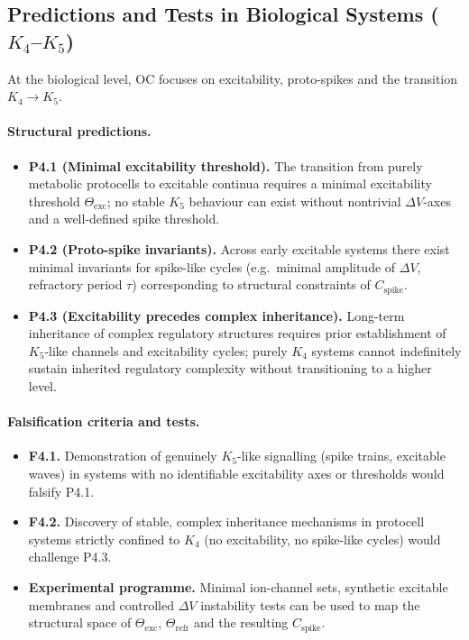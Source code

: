 \subsection{Predictions and Tests in Biological Systems
            (\texorpdfstring{$K_4$}{K\_4}--\texorpdfstring{$K_5$}{K\_5})}

At the biological level, OC focuses on excitability, proto-spikes and the
transition \(K_4 \to K_5\).

\paragraph{Structural predictions.}
\begin{itemize}
  \item \textbf{P4.1 (Minimal excitability threshold).}
        The transition from purely metabolic protocells to excitable continua
        requires a minimal excitability threshold \(\Theta_{\mathrm{exc}}\);
        no stable \(K_5\) behaviour can exist without nontrivial
        \(\Delta V\)-axes and a well-defined spike threshold.
  \item \textbf{P4.2 (Proto-spike invariants).}
        Across early excitable systems there exist minimal invariants for
        spike-like cycles (e.g.\ minimal amplitude of \(\Delta V\),
        refractory period \(\tau\)) corresponding to structural constraints
        of \(C_{\mathrm{spike}}\).
  \item \textbf{P4.3 (Excitability precedes complex inheritance).}
        Long-term inheritance of complex regulatory structures requires
        prior establishment of \(K_5\)-like channels and excitability
        cycles; purely \(K_4\) systems cannot indefinitely sustain
        inherited regulatory complexity without transitioning to a higher
        level.
\end{itemize}

\paragraph{Falsification criteria and tests.}
\begin{itemize}
  \item \textbf{F4.1.}
        Demonstration of genuinely \(K_5\)-like signalling (spike trains,
        excitable waves) in systems with no identifiable excitability axes
        or thresholds would falsify P4.1.
  \item \textbf{F4.2.}
        Discovery of stable, complex inheritance mechanisms in protocell
        systems strictly confined to \(K_4\) (no excitability, no spike-like
        cycles) would challenge P4.3.
  \item \textbf{Experimental programme.}
        Minimal ion-channel sets, synthetic excitable membranes and
        controlled \(\Delta V\) instability tests can be used to map
        the structural space of \(\Theta_{\mathrm{exc}}\),
        \(\Theta_{\mathrm{refr}}\) and the resulting \(C_{\mathrm{spike}}\).
\end{itemize}

